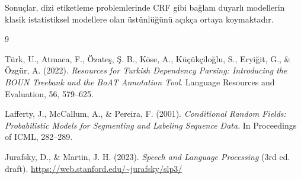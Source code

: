 \documentclass[12pt,a4paper]{article}
\begin{document}
Sonuçlar, dizi etiketleme problemlerinde CRF gibi bağlam duyarlı modellerin
klasik istatistiksel modellere olan üstünlüğünü açıkça ortaya koymaktadır.

\begin{thebibliography}{9}

Türk, U., Atmaca, F., Özateş, Ş. B., Köse, A., Küçükçiloğlu, S., Eryiğit, G.,
\& Özgür, A. (2022).
\textit{Resources for Turkish Dependency Parsing: Introducing the BOUN Treebank
and the BoAT Annotation Tool}.
Language Resources and Evaluation, 56, 579--625.

Lafferty, J., McCallum, A., \& Pereira, F. (2001).
\textit{Conditional Random Fields: Probabilistic Models for Segmenting and
Labeling Sequence Data}.
In Proceedings of ICML, 282--289.

Jurafsky, D., \& Martin, J. H. (2023).
\textit{Speech and Language Processing} (3rd ed. draft).
\url{https://web.stanford.edu/~jurafsky/slp3/}

\end{thebibliography}
\end{document}
